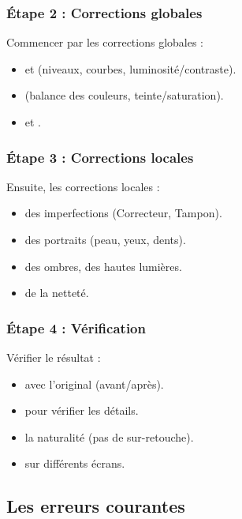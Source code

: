 \subsubsection{Étape 2 : Corrections globales}

Commencer par les corrections globales :

\begin{itemize}
    \item {} et  (niveaux, courbes, luminosité/contraste).
    \item {} (balance des couleurs, teinte/saturation).
    \item {} et .
\end{itemize}

\subsubsection{Étape 3 : Corrections locales}

Ensuite, les corrections locales :

\begin{itemize}
    \item {} des imperfections (Correcteur, Tampon).
    \item {} des portraits (peau, yeux, dents).
    \item {} des ombres,  des hautes lumières.
    \item {} de la netteté.
\end{itemize}

\subsubsection{Étape 4 : Vérification}

Vérifier le résultat :

\begin{itemize}
    \item {} avec l'original (avant/après).
    \item {} pour vérifier les détails.
    \item {} la naturalité (pas de sur-retouche).
    \item {} sur différents écrans.
\end{itemize}

\subsection{Les erreurs courantes}

